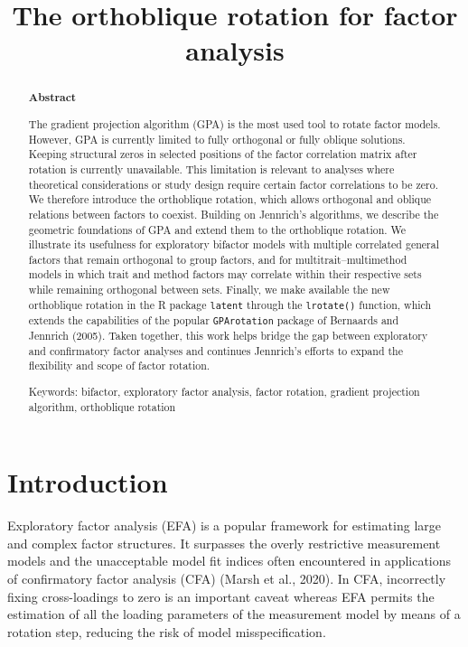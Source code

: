 \documentclass[
  12pt,
  letterpaper,
  article]{scrartcl}
\title{The orthoblique rotation for factor analysis}
\author{}
\date{}
\begin{document}
\maketitle
\begin{abstract}
\begin{center}
\fontsize{14}{14}\selectfont \textbf{Abstract}
\end{center}
\vspace{1cm}

The gradient projection algorithm (GPA) is the most used tool to rotate
factor models. However, GPA is currently limited to fully orthogonal or
fully oblique solutions. Keeping structural zeros in selected positions
of the factor correlation matrix after rotation is currently
unavailable. This limitation is relevant to analyses where theoretical
considerations or study design require certain factor correlations to be
zero. We therefore introduce the orthoblique rotation, which allows
orthogonal and oblique relations between factors to coexist. Building on
Jennrich's algorithms, we describe the geometric foundations of GPA and
extend them to the orthoblique rotation. We illustrate its usefulness
for exploratory bifactor models with multiple correlated general factors
that remain orthogonal to group factors, and for multitrait--multimethod
models in which trait and method factors may correlate within their
respective sets while remaining orthogonal between sets. Finally, we
make available the new orthoblique rotation in the R package
\texttt{latent} through the \texttt{lrotate()} function, which extends
the capabilities of the popular \texttt{GPArotation} package of
Bernaards and Jennrich (2005). Taken together, this work helps bridge
the gap between exploratory and confirmatory factor analyses and
continues Jennrich's efforts to expand the flexibility and scope of
factor rotation.

Keywords: bifactor, exploratory factor analysis, factor rotation,
gradient projection algorithm, orthoblique rotation
\end{abstract}


\doublespacing
\fontsize{12}{12}\selectfont

\newpage

\section{Introduction}\label{introduction}

Exploratory factor analysis (EFA) is a popular framework for estimating
large and complex factor structures. It surpasses the overly restrictive
measurement models and the unacceptable model fit indices often
encountered in applications of confirmatory factor analysis (CFA) (Marsh
et al., 2020). In CFA, incorrectly fixing cross-loadings to zero is an
important caveat whereas EFA permits the estimation of all the loading
parameters of the measurement model by means of a rotation step,
reducing the risk of model misspecification.
\end{document}

